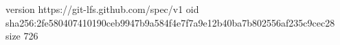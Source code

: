 version https://git-lfs.github.com/spec/v1
oid sha256:2fe580407410190ceb9947b9a584f4e7f7a9e12b40ba7b802556af235c9cec28
size 726
